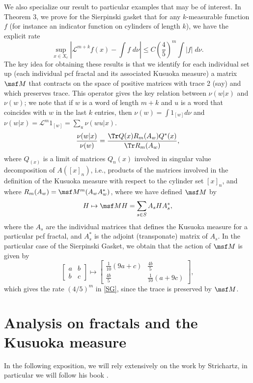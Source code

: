 \documentclass[11pt]{scrartcl}
\theoremstyle{plain} %
\theoremstyle{definition}
\begin{document}
We also specialize our result to particular examples that may be of interest. In Theorem 3, we prove for the Sierpinski gasket that for any $k$-measurable function $f$ (for instance an indicator function on cylinders of length $k$), we have the explicit rate
\begin{equation}\label{SG}
\sup_{x\in X_c} |{\mathcal L}^{m+k} f(x)-\int f\; d\nu|\leq C\left(\frac{4}{5}\right)^m\int |f|\; d\nu.
\end{equation}
The key idea for obtaining these results is that we identify for each individual set up (each individual pcf fractal and its associated Kusuoka measure) a matrix $\msf M$ that contracts on the space of positive matrices with trace 2 (say) and which preserves trace. This operator gives the key relation between $\nu(w|x)$ and $\nu(w)$; we note that if $w$ is a word of length $m+k$ and $u$ is a word that coincides with $w$ in the last $k$ entries, then $\nu(w)=\int 1_{[w]} d\nu$ and $\nu(w|x)={\mathcal L}^m 1_{[w]}=\sum_u \nu(wu|x)$.
$$\frac{\nu(w|x)}{\nu(w)}=\frac{\Tr Q(x)R_m(A_w)Q^*(x)}{\Tr R_m(A_w)},$$
where $Q_(x)$ is a limit of matrices $Q_n(x)$ involved in singular value decomposition of $A([x]_n)$, i.e., products of the matrices involved in the definition of the Kusuoka measure with respect to the cylinder set $[x]_n$, and where $R_m(A_w)=\msf M^m (A_w A_w^*)$, where we have 
defined $\msf M$ by
$$ H \mapsto \msf M H = \sum_{s\in S} A_s H A_s^* ,$$
where the $A_s$ are the individual matrices that defines the Kusuoka measure for a particular pcf fractal, and $A_s^*$ is the adjoint (transponate) matrix of $A_s$. In the particular case of the Sierpinski Gasket, we obtain that the action of $\msf M$ is given by
$$
\begin{bmatrix} a & b \\ b & c \end{bmatrix}
\mapsto
\begin{bmatrix}
 \frac{1}{10} (9 a+c) & \frac{4 b}{5} \\
 \frac{4 b}{5} & \frac{1}{10} (a+9 c)
\end{bmatrix},
$$
which gives the rate $(4/5)^m$ in \eqref{SG}, since the trace is preserved by $\msf M$.

\section{Analysis on fractals and the Kusuoka measure}
In the following exposition, we will rely extensively on the work by Strichartz, in particular we will follow his book \cite{str}. 
\end{document}
